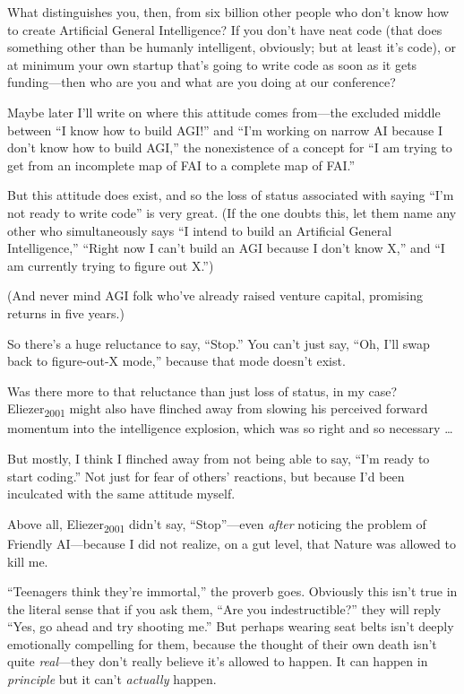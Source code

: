 {
 What distinguishes you, then, from six billion other people who
don't know how to create Artificial General
Intelligence? If you don't have neat code (that does
something other than be humanly intelligent, obviously; but at least
it's code), or at minimum your own startup
that's going to write code as soon as it gets
funding---then who are you and what are you doing at our conference?}

{
 Maybe later I'll write on where this attitude
comes from---the excluded middle between ``I know how
to build AGI!'' and
``I'm working on narrow AI because I
don't know how to build AGI,'' the
nonexistence of a concept for ``I am trying to get
from an incomplete map of FAI to a complete map of
FAI.''}

{
 But this attitude does exist, and so the loss of status associated
with saying ``I'm not ready to write
code'' is very great. (If the one doubts this, let
them name any other who simultaneously says ``I intend
to build an Artificial General Intelligence,''
``Right now I can't build an AGI
because I don't know X,'' and
``I am currently trying to figure out
X.'')}

{
 (And never mind AGI folk who've already raised
venture capital, promising returns in five years.)}

{
 So there's a huge reluctance to say,
``Stop.'' You can't
just say, ``Oh, I'll swap back to
figure-out-X mode,'' because that mode
doesn't exist.}

{
 Was there more to that reluctance than just loss of status, in my
case? Eliezer\textsubscript{2001} might also have flinched away from
slowing his perceived forward momentum into the intelligence explosion,
which was so right and so necessary \ldots}

{
 But mostly, I think I flinched away from not being able to say,
``I'm ready to start
coding.'' Not just for fear of
others' reactions, but because I'd been
inculcated with the same attitude myself.}

{
 Above all, Eliezer\textsubscript{2001} didn't say,
``Stop''---even \textit{after}
noticing the problem of Friendly AI---because I did not realize, on a
gut level, that Nature was allowed to kill me.}

{
 ``Teenagers think they're
immortal,'' the proverb goes. Obviously this
isn't true in the literal sense that if you ask them,
``Are you indestructible?'' they
will reply ``Yes, go ahead and try shooting
me.'' But perhaps wearing seat belts
isn't deeply emotionally compelling for them, because
the thought of their own death isn't quite
\textit{real}{}---they don't really believe
it's allowed to happen. It can happen in
\textit{principle} but it can't \textit{actually}
happen.}

